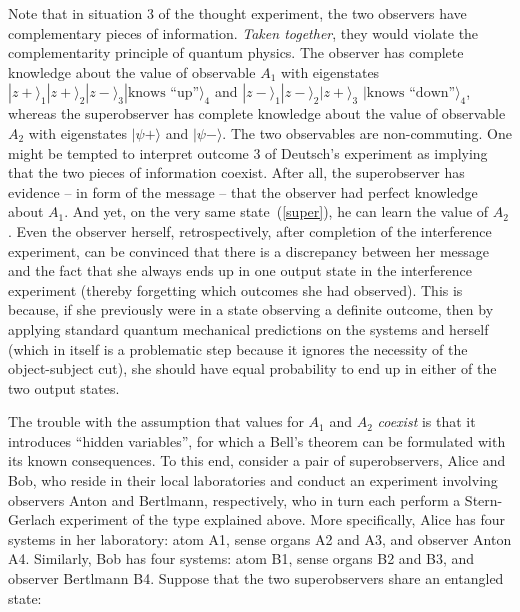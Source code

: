 \documentclass[12pt,a4]{article}
\begin{document}
Note that in situation 3 of the thought experiment, the two observers have complementary pieces of information. {\it Taken together}, they would violate the complementarity principle of quantum physics. The observer has complete knowledge about the value of observable $A_1$ with eigenstates $|z+\rangle_1|z+\rangle_2|z-\rangle_3|\mbox{knows ``up''}\rangle_4$ and $|z-\rangle_1|z-\rangle_2|z+\rangle_3 $ $ |\mbox{knows ``down''}\rangle_4$, whereas the superobserver has complete knowledge about the value of observable $A_2$ with eigenstates $|\psi+\rangle$ and $|\psi-\rangle$. The two observables are non-commuting. One might be tempted to interpret outcome 3 of Deutsch's experiment as implying that the two pieces of information coexist. After all, the superobserver has evidence -- in form of the message -- that the observer had perfect knowledge about $A_1$. And yet, on the very same state~(\ref{super}), he can learn the value of $A_2$. Even the observer herself, retrospectively, after completion of the interference experiment, can be convinced that there is a discrepancy between her message and the fact that she always ends up in one output state in the interference experiment (thereby forgetting which outcomes she had observed). This is because, if she previously were in a state observing a definite outcome, then by applying standard quantum mechanical predictions on the systems and herself (which in itself is a problematic step because it ignores the necessity of the object-subject cut), she should have equal probability to end up in either of the two output states. 

The trouble with the assumption that values for $A_1$ and $A_2$ {\it coexist} is that it introduces ``hidden variables'', for which a Bell's theorem can be formulated with its known consequences. To this end, consider a pair of superobservers, Alice and Bob, who reside in their local laboratories and conduct an experiment involving observers Anton and Bertlmann, respectively, who in turn each perform a Stern-Gerlach experiment of the type explained above. More specifically, Alice has four systems in her laboratory: atom A1, sense organs A2 and A3, and observer Anton A4. Similarly, Bob has four systems: atom B1, sense organs B2 and B3, and observer Bertlmann B4. Suppose that the two superobservers share an entangled state:
\end{document}
